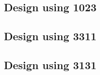  \begin{center}




 \end{center}



\subsection{Design using 1023}


 \begin{center}




 \end{center}



\subsection{Design using 3311}


 \begin{center}




 \end{center}



\subsection{Design using 3131}


 \begin{center}




 \end{center}



